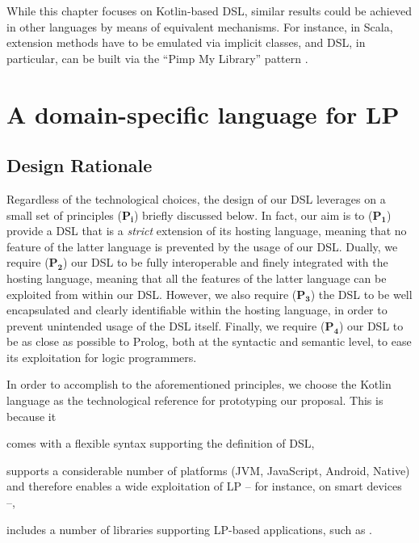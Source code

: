 \documentclass[12pt,a4paper,openright,twoside]{book}
\begin{document}
While this chapter focuses on Kotlin-based DSL, similar results could be achieved in other languages by means of equivalent mechanisms.
%
For instance, in Scala, extension methods have to be emulated via implicit classes, and DSL, in particular, can be built via the ``Pimp My Library'' pattern \cite{Oliveira2010}.

\section{A domain-specific language for LP}\label{sec:contribution}

\subsection{Design Rationale}

Regardless of the technological choices, the design of our DSL leverages on a small set of principles ($\mathbf{P_i}$) briefly discussed below.
%
In fact, our aim is to ($\mathbf{P_1}$) provide a DSL that is a \emph{strict} extension of its hosting language, meaning that no feature of the latter language is prevented by the usage of our DSL.
%
Dually, we require ($\mathbf{P_2}$) our DSL to be fully interoperable and finely integrated with the hosting language, meaning that all the features of the latter language can be exploited from within our DSL.
%
However, we also require ($\mathbf{P_3}$) the DSL to be well encapsulated and clearly identifiable within the hosting language, in order to prevent unintended usage of the DSL itself.
%
Finally, we require ($\mathbf{P_4}$) our DSL to be as close as possible to Prolog, both at the syntactic and semantic level, to ease its exploitation for logic programmers.

In order to accomplish to the aforementioned principles, we choose the Kotlin language as the technological reference for prototyping our proposal.
%
This is because it
%
\begin{inlinelist}
    \item comes with a flexible syntax supporting the definition of DSL,
    \item supports a considerable number of platforms (JVM, JavaScript, Android, Native) and therefore enables a wide exploitation of LP -- for instance, on smart devices --,
    \item includes a number of libraries supporting LP-based applications, such as \twopkt{}.
\end{inlinelist}
\end{document}
